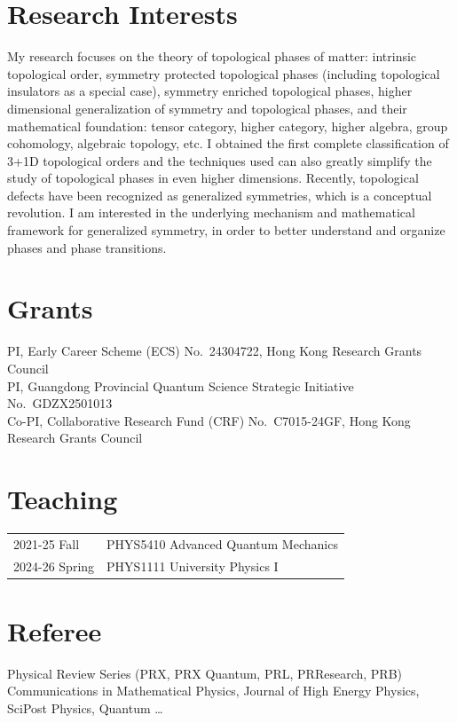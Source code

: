 \documentclass[hidelinks,a4paper]{article}
\begin{document}
\section*{Research Interests}
My research focuses on the theory of topological phases of matter: intrinsic topological order, symmetry protected topological phases (including topological insulators as a special case), symmetry enriched topological phases, higher dimensional generalization of symmetry and topological phases, and their mathematical foundation: tensor category, higher category, higher algebra, group cohomology, algebraic topology, etc.
I obtained the first complete classification of 3+1D topological orders and the techniques used can also greatly simplify the study of topological phases in even higher dimensions.
Recently, topological defects have been recognized as generalized symmetries, which is a conceptual revolution. I am interested in the underlying mechanism and mathematical framework for generalized symmetry, in order to better understand and organize phases and phase transitions.


\section*{Grants}
PI, Early Career Scheme (ECS) No.~24304722, Hong Kong Research Grants Council\\
PI, Guangdong Provincial Quantum Science Strategic Initiative No.~GDZX2501013\\
Co-PI, Collaborative Research Fund (CRF) No.~C7015-24GF, Hong Kong Research Grants Council
	

\section*{Teaching}
\begin{tabular}{ll}
  2021-25 Fall & PHYS5410 Advanced Quantum Mechanics\\
  2024-26 Spring& PHYS1111 University Physics I %
\end{tabular}



\section*{Referee}
Physical Review Series (PRX, PRX Quantum, PRL, PRResearch, PRB)\\
Communications in Mathematical Physics, Journal of High Energy Physics, SciPost Physics, Quantum \dots
\end{document}
